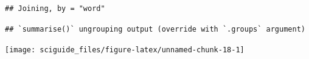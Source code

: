 \documentclass[]{tufte-book}
\newenvironment{Shaded}{}{}
\newcommand{\CommentTok}[1]{\textcolor[rgb]{0.38,0.63,0.69}{\textit{#1}}}
\newcommand{\DataTypeTok}[1]{\textcolor[rgb]{0.56,0.13,0.00}{#1}}
\newcommand{\DecValTok}[1]{\textcolor[rgb]{0.25,0.63,0.44}{#1}}
\newcommand{\KeywordTok}[1]{\textcolor[rgb]{0.00,0.44,0.13}{\textbf{#1}}}
\newcommand{\NormalTok}[1]{#1}
\newcommand{\OperatorTok}[1]{\textcolor[rgb]{0.40,0.40,0.40}{#1}}
\newcommand{\OtherTok}[1]{\textcolor[rgb]{0.00,0.44,0.13}{#1}}
\newcommand{\StringTok}[1]{\textcolor[rgb]{0.25,0.44,0.63}{#1}}
\begin{document}
\begin{verbatim}
## Joining, by = "word"
\end{verbatim}

\begin{Shaded}
\end{Shaded}

\begin{verbatim}
## `summarise()` ungrouping output (override with `.groups` argument)
\end{verbatim}

\begin{Shaded}
\end{Shaded}

\texttt{[image: sciguide\_files/figure-latex/unnamed-chunk-18-1]}
\end{document}
